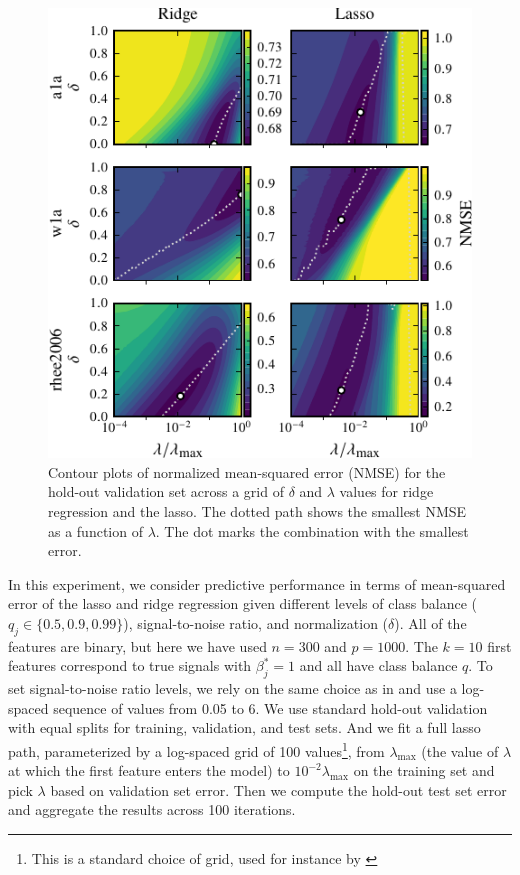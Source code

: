 \begin{figure}[htpb]
  \centering
  \includegraphics[]{plots/hyperopt_surfaces.pdf}
  \caption{%
    Contour plots of normalized mean-squared error (NMSE) for the hold-out validation set
    across a grid of \(\delta\) and \(\lambda\) values for ridge regression and the lasso. The
    dotted path shows the smallest NMSE as a function of \(\lambda\). The dot marks the
    combination with the smallest error.
  }
  \label{fig:hyperopt-contours-full}
\end{figure}

In this experiment, we consider predictive performance in terms of mean-squared error of
the lasso and ridge regression given different levels of class balance (\(q_j \in \{0.5,
0.9, 0.99\}\)), signal-to-noise ratio, and normalization (\(\delta\)). All of the features
are binary, but here we have used \(n=300\) and \(p = \num{1000}\). The \(k=10\) first
features correspond to true signals with \(\beta^*_j = 1\) and all have class balance
\(q\). To set signal-to-noise ratio levels, we rely on the same choice as in
\citet{hastie2020} and use a log-spaced sequence of values from 0.05 to 6. We use standard
hold-out validation with equal splits for training, validation, and test sets. And we fit a
full lasso path, parameterized by a log-spaced grid of 100 values\footnote{This is a
  standard choice of grid, used for instance by \citet{friedman2010}}, from
\(\lambda_\text{max}\) (the value of \(\lambda\) at which the first feature enters the
model) to \(10^{-2}\lambda_\text{max}\) on the training set and pick \(\lambda\) based on
validation set error. Then we compute the hold-out test set error and aggregate the results
across 100 iterations.

